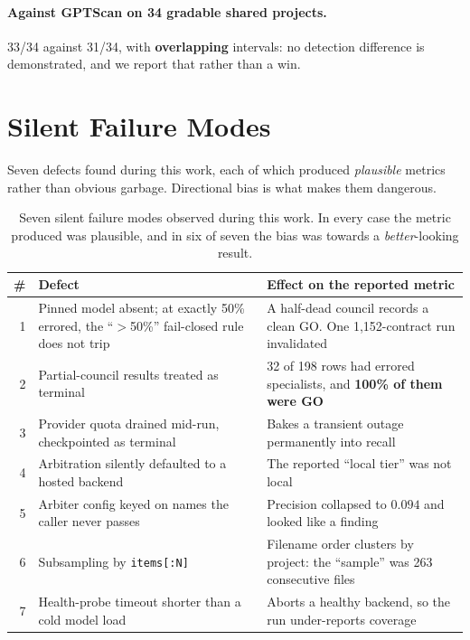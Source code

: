 \documentclass[sigconf,nonacm]{acmart}
\begin{document}
\paragraph{Against GPTScan on 34 gradable shared projects.}
33/34 against 31/34, with \textbf{overlapping} intervals: no detection difference
is demonstrated, and we report that rather than a win.

\section{Silent Failure Modes}

Seven defects found during this work, each of which produced \emph{plausible}
metrics rather than obvious garbage. Directional bias is what makes them
dangerous.

\begin{table}[t]
\centering
\caption{Seven silent failure modes observed during this work. In every case the
metric produced was plausible, and in six of seven the bias was towards a
\emph{better}-looking result.}
\label{tab:defects}
\small
\begin{tabular}{@{}rp{}p{}@{}}
\toprule
\textbf{\#} & \textbf{Defect} & \textbf{Effect on the reported metric} \\
\midrule
1 & Pinned model absent; at exactly 50\% errored, the ``$>$50\%'' fail-closed rule
does not trip &
A half-dead council records a clean GO. One 1,152-contract run invalidated \\
2 & Partial-council results treated as terminal &
32 of 198 rows had errored specialists, and \textbf{100\% of them were GO} \\
3 & Provider quota drained mid-run, checkpointed as terminal &
Bakes a transient outage permanently into recall \\
4 & Arbitration silently defaulted to a hosted backend &
The reported ``local tier'' was not local \\
5 & Arbiter config keyed on names the caller never passes &
Precision collapsed to $0.094$ and looked like a finding \\
6 & Subsampling by \texttt{items[:N]} &
Filename order clusters by project: the ``sample'' was 263 consecutive files \\
7 & Health-probe timeout shorter than a cold model load &
Aborts a healthy backend, so the run under-reports coverage \\
\bottomrule
\end{tabular}
\end{table}
\end{document}

